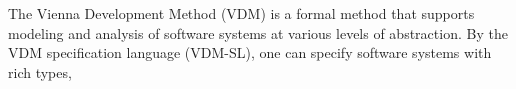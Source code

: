The Vienna Development Method (VDM) is a formal method that supports modeling and analysis of software systems at various levels of abstraction. By the VDM specification language (VDM-SL), one can specify software systems with rich types, 

